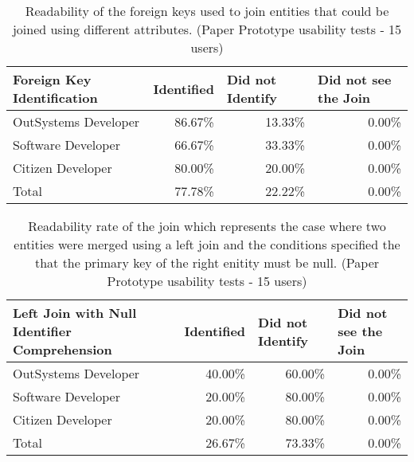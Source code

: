 \begin{table}[tb]
  \caption{Readability of the foreign keys used to join entities that could be joined using different attributes. (Paper Prototype usability tests - 15 users)}
    \label{tab:paperPrototypeForeignKeyIdentification}
  \begin{tabular}{@{}lrrr@{}}
  \toprule
  \textbf{Foreign Key Identification} & \multicolumn{1}{l}{Identified} & \multicolumn{1}{l}{Did not Identify} & \multicolumn{1}{l}{Did not see the Join} \\ \midrule
  OutSystems Developer                & 86.67\%                        & 13.33\%                              & 0.00\%                                   \\
  Software Developer                  & 66.67\%                        & 33.33\%                              & 0.00\%                                   \\
  Citizen Developer                   & 80.00\%                        & 20.00\%                              & 0.00\%                                   \\
  Total                               & 77.78\%                        & 22.22\%                              & 0.00\%                                   \\ \bottomrule
  \end{tabular}
  \end{table}

\begin{table}[tb]
  \caption{Readability rate of the join which represents the case where two entities were merged using a left join and the conditions specified the that the primary key of the right enitity must be null. (Paper Prototype usability tests - 15 users)}
    \label{tab:paperPrototypeLeftJoinNull}
  \begin{tabular}{@{}m{5.4cm}rrr@{}}
  \toprule
  \textbf{Left Join with Null Identifier Comprehension} & \multicolumn{1}{l}{Identified} & \multicolumn{1}{l}{Did not Identify} & \multicolumn{1}{l}{Did not see the Join} \\ \midrule
  OutSystems Developer                                  & 40.00\%                        & 60.00\%                              & 0.00\%                                   \\
  Software Developer                                    & 20.00\%                        & 80.00\%                              & 0.00\%                                   \\
  Citizen Developer                                     & 20.00\%                        & 80.00\%                              & 0.00\%                                   \\
  Total                                                 & 26.67\%                        & 73.33\%                              & 0.00\%                                   \\ \bottomrule
  \end{tabular}
  \end{table}


